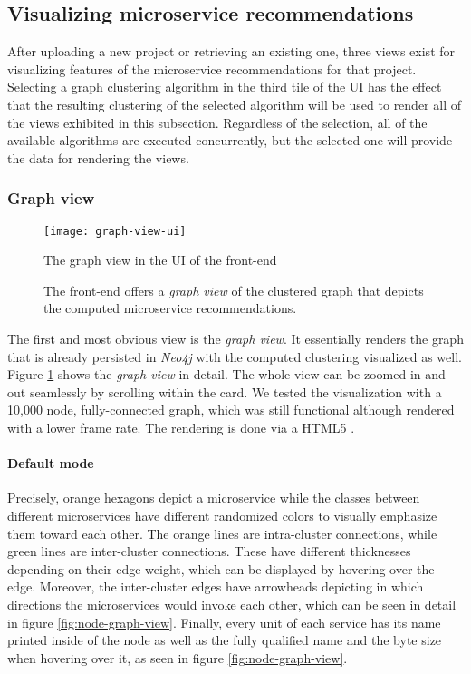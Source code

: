 \documentclass[12pt,a4paper]{report}
\begin{document}
\subsection{Visualizing microservice recommendations}

After uploading a new project or retrieving an existing one, three views exist
for visualizing features of the microservice recommendations for that project.
Selecting a graph clustering algorithm in the third tile of the UI has the
effect that the resulting clustering of the selected algorithm will be used to
render all of the views exhibited in this subsection. Regardless of the
selection, all of the available algorithms are executed concurrently, but the
selected one will provide the data for rendering the views.


\subsubsection{Graph view}
\begin{figure}[htbp]
\centering
\texttt{[image: graph-view-ui]}
\caption{The graph view in the UI of the front-end}
\caption*{\centering
  The front-end offers a \textit{graph view} of the clustered graph that depicts
  the computed microservice recommendations.
}
\label{fig:graph-view-ui}
\end{figure}

The first and most obvious view is the \textit{graph view}. It essentially
renders the graph that is already persisted in \textit{Neo4j} with the computed
clustering visualized as well. Figure \ref{fig:graph-view-ui} shows the \textit{
graph view} in detail. The whole view can be zoomed in and out seamlessly by
scrolling within the card. We tested the visualization with a 10,000 node,
fully-connected graph, which was still functional although rendered with a
lower frame rate. The rendering is done via a HTML5 .

\paragraph{Default mode} Precisely, orange hexagons depict a microservice while
the classes between different microservices have different randomized colors to
visually emphasize them toward each other. The orange lines are intra-cluster
connections, while green lines are inter-cluster connections. These have
different thicknesses depending on their edge weight, which can be displayed by
hovering over the edge. Moreover, the inter-cluster edges have arrowheads
depicting in which directions the microservices would invoke each other, which
can be seen in detail in figure \ref{fig:node-graph-view}. Finally, every unit
of each service has its name printed inside of the node as well as the fully
qualified name and the byte size when hovering over it, as seen in figure
\ref{fig:node-graph-view}.
\end{document}

